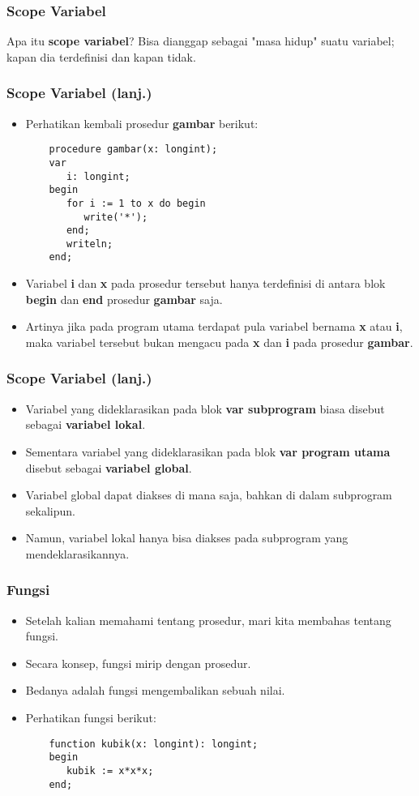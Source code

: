 \documentclass{beamer}
\begin{document}
\begin{frame}[fragile]
\frametitle{Scope Variabel}
\begin{block}{Apa itu \textbf{scope variabel}?}
Bisa dianggap sebagai "masa hidup" suatu variabel; kapan dia terdefinisi dan kapan tidak.
\end{block}
\end{frame}

\begin{frame}[fragile]
\frametitle{Scope Variabel (lanj.)}
\begin{itemize}
	\item Perhatikan kembali prosedur \textbf{gambar} berikut:
	\begin{lstlisting}
	procedure gambar(x: longint);
	var
	   i: longint;
	begin
	   for i := 1 to x do begin
	      write('*');
	   end;
	   writeln;
	end;
	\end{lstlisting}
	\item Variabel \textbf{i} dan \textbf{x} pada prosedur tersebut hanya terdefinisi di antara blok \textbf{begin} dan \textbf{end} prosedur \textbf{gambar} saja.
	\item Artinya jika pada program utama terdapat pula variabel bernama \textbf{x} atau \textbf{i}, maka variabel tersebut \alert{bukan} mengacu pada \textbf{x} dan \textbf{i} pada prosedur \textbf{gambar}.
\end{itemize}
\end{frame}

\begin{frame}[fragile]
\frametitle{Scope Variabel (lanj.)}
\begin{itemize}
	\item Variabel yang dideklarasikan pada blok \textbf{var subprogram} biasa disebut sebagai \textbf{variabel lokal}.
	\item Sementara variabel yang dideklarasikan pada blok \textbf{var program utama} disebut sebagai \textbf{variabel global}.
	\item Variabel global dapat diakses di mana saja, bahkan di dalam subprogram sekalipun.
	\item Namun, variabel lokal hanya bisa diakses pada subprogram yang mendeklarasikannya.
\end{itemize}
\end{frame}

\begin{frame}[fragile]
\frametitle{Fungsi}
\begin{itemize}
	\item Setelah kalian memahami tentang prosedur, mari kita membahas tentang fungsi.
	\item Secara konsep, fungsi mirip dengan prosedur.
	\item Bedanya adalah fungsi \alert{mengembalikan sebuah nilai}.
	\item Perhatikan fungsi berikut:
	\begin{lstlisting}
	function kubik(x: longint): longint;
	begin
	   kubik := x*x*x;
	end;
	\end{lstlisting}
\end{itemize}
\end{frame}
\end{document}
